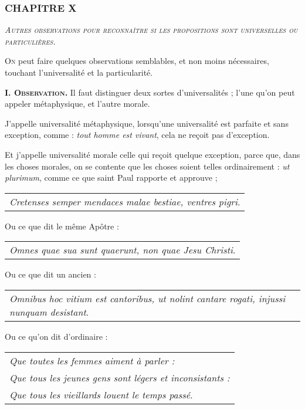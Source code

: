 \subsubsection{\centering \Large CHAPITRE X}
\begin{center}\emph{\large\scshape Autres observations pour reconnaître si les propositions sont universelles ou particulières.}\end{center}

	\lettrine{O}{n} peut faire quelques observations semblables, et non moins nécessaires, touchant l'universalité et la particularité.

\bigbreak
{\bfseries\scshape I. Observation.} Il faut distinguer deux sortes d'universalités ; l'une qu'on peut appeler métaphysique, et l'autre morale.

J'appelle universalité métaphysique, lorsqu'une universalité est parfaite et sans exception, comme : \emph{tout homme est vivant}, cela ne reçoit pas d'exception.

Et j'appelle universalité morale celle qui reçoit quelque exception, parce que, dans les choses morales, on se contente que les choses soient telles ordinairement : \emph{ut plurimum}, comme ce que saint Paul rapporte et approuve ;

	\begin{tabularx}{\textwidth}{X}
		\emph{Cretenses semper mendaces malae bestiae, ventres pigri}. \\
	\end{tabularx}

Ou ce que dit le même Apôtre :
	\begin{tabularx}{\textwidth}{X}
		\emph{Omnes quae sua sunt quaerunt, non quae Jesu Christi}. \\
	\end{tabularx}

Ou ce que dit un ancien :
	\begin{tabularx}{\textwidth}{X}
		\emph{Omnibus hoc vitium est cantoribus, ut nolint cantare rogati, injussi nunquam desistant}. \\
	\end{tabularx}


Ou ce qu'on dit d'ordinaire :
	\begin{tabularx}{\textwidth}{X}
		\emph{Que toutes les femmes aiment à parler :} \\
		\emph{Que tous les jeunes gens sont légers et inconsistants :} \\
		\emph{Que tous les vieillards louent le temps passé}. \\
	\end{tabularx}

